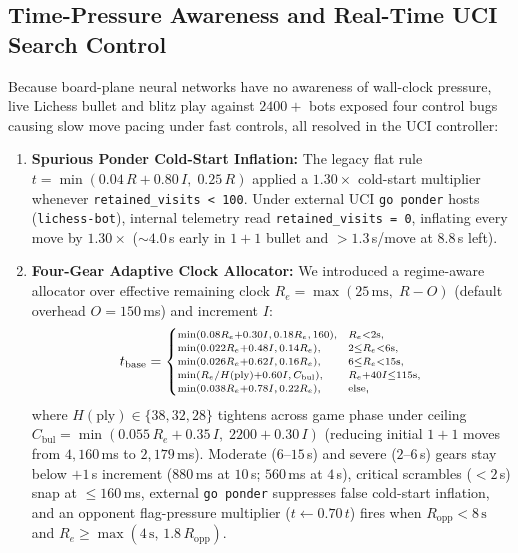 \documentclass[10pt,twocolumn]{article}
\begin{document}
\subsection{Time-Pressure Awareness and Real-Time UCI Search Control}
\label{app:clock}
Because board-plane neural networks have no awareness of wall-clock pressure, live Lichess bullet and blitz play against $2400+$ bots exposed four control bugs causing slow move pacing under fast controls, all resolved in the UCI controller:
\begin{enumerate}
  \item \textbf{Spurious Ponder Cold-Start Inflation:} The legacy flat rule $t = \min(0.04\,R + 0.80\,I,\; 0.25\,R)$ applied a $1.30\times$ cold-start multiplier whenever \texttt{retained\_visits < 100}. Under external UCI \texttt{go ponder} hosts (\texttt{lichess-bot}), internal telemetry read \texttt{retained\_visits = 0}, inflating every move by $1.30\times$ (${\sim}4.0$\,s early in $1+1$ bullet and $>1.3$\,s/move at $8.8$\,s left).
  \item \textbf{Four-Gear Adaptive Clock Allocator:} We introduced a regime-aware allocator over effective remaining clock $R_e = \max(25\,\mathrm{ms},\; R - O)$ (default overhead $O = 150$\,ms) and increment $I$:
  \begin{equation}
    {\scriptsize
    t_{\mathrm{base}} =
    \begin{cases}
      \min(0.08R_e{+}0.30I, 0.18R_e, 160), & R_e{<}2\text{s}, \\
      \min(0.022R_e{+}0.48I, 0.14R_e), & 2{\le}R_e{<}6\text{s}, \\
      \min(0.026R_e{+}0.62I, 0.16R_e), & 6{\le}R_e{<}15\text{s}, \\
      \min(R_e/H(\mathrm{ply}){+}0.60I, C_{\mathrm{bul}}), & R_e{+}40I{\le}115\text{s}, \\
      \min(0.038R_e{+}0.78I, 0.22R_e), & \text{else},
    \end{cases}}
    \label{eq:clock}
  \end{equation}
  where $H(\mathrm{ply}) \in \{38, 32, 28\}$ tightens across game phase under ceiling $C_{\mathrm{bul}} = \min(0.055\,R_e + 0.35\,I,\; 2200 + 0.30\,I)$ (reducing initial $1+1$ moves from $4{,}160$\,ms to $2{,}179$\,ms). Moderate ($6\text{--}15$\,s) and severe ($2\text{--}6$\,s) gears stay below $+1$\,s increment ($880$\,ms at $10$\,s; $560$\,ms at $4$\,s), critical scrambles ($<2$\,s) snap at $\le 160$\,ms, external \texttt{go ponder} suppresses false cold-start inflation, and an opponent flag-pressure multiplier ($t \leftarrow 0.70\,t$) fires when $R_{\mathrm{opp}} < 8\,\mathrm{s}$ and $R_e \ge \max(4\,\mathrm{s},\, 1.8\,R_{\mathrm{opp}})$.

\end{enumerate}
\end{document}
